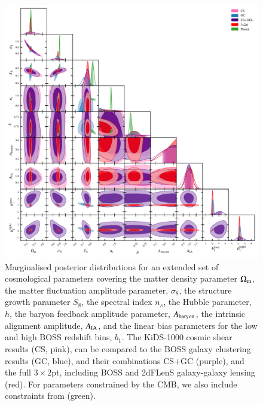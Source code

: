 \begin{figure}
	\begin{center}
		\includegraphics[width=\textwidth]{Parameter_Plots/cosmology/omegam_sigma8_s8_ns_h_a_baryon_a_ia_b1l_b1h_blind_C}
		\caption{Marginalised posterior distributions for an extended set of cosmological parameters covering the matter density parameter $\Omega_{\rm m}$, the matter fluctuation amplitude parameter, $\sigma_8$, the structure growth parameter $S_8$, the spectral index $n_s$, the Hubble parameter, $h$, the baryon feedback amplitude parameter, $A_{\rm baryon}$, the intrinsic alignment amplitude, $A_{\rm IA}$, and the linear bias parameters for the low and high BOSS redshift bins, $b_1$.   The KiDS-1000 cosmic shear results (CS, pink), can be compared to the BOSS galaxy clustering results (GC, blue), and their combinations CS+GC (purple), and the full $3\times2$pt, including BOSS and 2dFLenS galaxy-galaxy lensing (red).   For parameters constrained by the CMB, we also include constraints from \citet{planck/etal:2018} (green).}
		\label{fig:cosmology-params-all}
	\end{center}
\end{figure}


